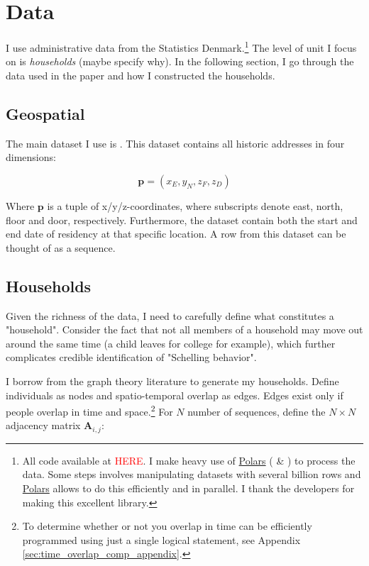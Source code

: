 \documentclass[main.tex]{subfiles}
\begin{document}
\section{Data}
\label{sec:data}
I use administrative data from the Statistics Denmark.\footnote{All code available at \textcolor{red}{HERE}. I make heavy use of \href{https://github.com/pola-rs/polars}{Polars} (\textcite{polars_ritchie_vink_2025} \& \textcite{polars_grouper_van_eechoud}) to process the data. Some steps involves manipulating datasets with several billion rows and \href{https://github.com/pola-rs/polars}{Polars} allows to do this efficiently and in parallel. I thank the developers for making this excellent library.} The level of unit I focus on is \textit{households} (maybe specify why). In the following section, I go through the data used in the paper and how I constructed the households.

\subsection{Geospatial}
The main dataset I use is . This dataset contains all historic addresses in four dimensions:

\begin{equation}
    \mathbf{p} = (x_E, y_N, z_F, z_D)
\end{equation}

\noindent
Where $\textbf{p}$ is a tuple of x/y/z-coordinates, where subscripts denote east, north, floor and door, respectively. Furthermore, the dataset contain both the start and end date of residency at that specific location. A row from this dataset can be thought of as a sequence.

\subsection{Households}
Given the richness of the data, I need to carefully define what constitutes a "household". Consider the fact that not all members of a household may move out around the same time (a child leaves for college for example), which further complicates credible identification of "Schelling behavior".

I borrow from the graph theory literature to generate my households. Define individuals as nodes and spatio-temporal overlap as edges. Edges exist only if people overlap in time and space.\footnote{To determine whether or not you overlap in time can be efficiently programmed using just a single logical statement, see Appendix \ref{sec:time_overlap_comp_appendix}.} For $N$ number of sequences, define the $N \times N$ adjacency matrix $\mathbf{A}_{i,j}$:
\end{document}
